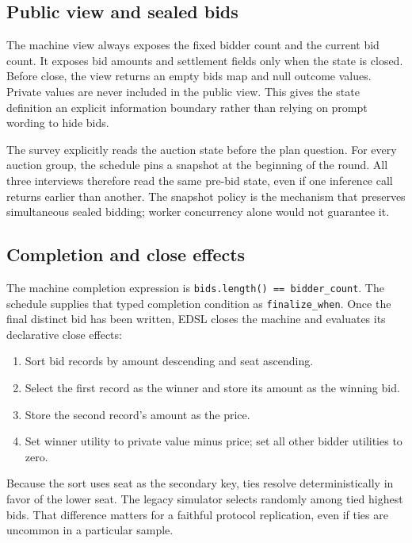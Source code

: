 \documentclass[11pt]{article}
\begin{document}
\subsection{Public view and sealed bids}

The machine view always exposes the fixed bidder count and the current bid count. It exposes bid amounts and settlement fields only when the state is closed. Before close, the view returns an empty bids map and null outcome values. Private values are never included in the public view. This gives the state definition an explicit information boundary rather than relying on prompt wording to hide bids.

The survey explicitly reads the auction state before the plan question. For every auction group, the schedule pins a snapshot at the beginning of the round. All three interviews therefore read the same pre-bid state, even if one inference call returns earlier than another. The snapshot policy is the mechanism that preserves simultaneous sealed bidding; worker concurrency alone would not guarantee it.

\subsection{Completion and close effects}

The machine completion expression is \texttt{bids.length() == bidder\_count}. The schedule supplies that typed completion condition as \texttt{finalize\_when}. Once the final distinct bid has been written, EDSL closes the machine and evaluates its declarative close effects:

\begin{enumerate}
  \item Sort bid records by amount descending and seat ascending.
  \item Select the first record as the winner and store its amount as the winning bid.
  \item Store the second record's amount as the price.
  \item Set winner utility to private value minus price; set all other bidder utilities to zero.
\end{enumerate}

Because the sort uses seat as the secondary key, ties resolve deterministically in favor of the lower seat. The legacy simulator selects randomly among tied highest bids. That difference matters for a faithful protocol replication, even if ties are uncommon in a particular sample.
\end{document}
